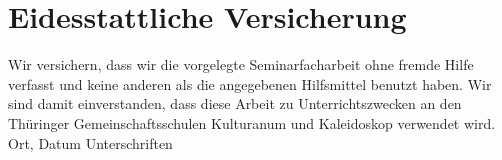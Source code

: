 \chapter{Eidesstattliche Versicherung}
Wir versichern, dass wir die vorgelegte Seminarfacharbeit ohne fremde Hilfe verfasst und keine anderen als die angegebenen Hilfsmittel benutzt haben.
Wir sind damit einverstanden, dass diese Arbeit zu Unterrichtszwecken an den Thüringer Gemeinschaftsschulen Kulturanum und Kaleidoskop verwendet wird.
\newline
\newline
Ort, Datum \qquad \qquad \qquad Unterschriften
